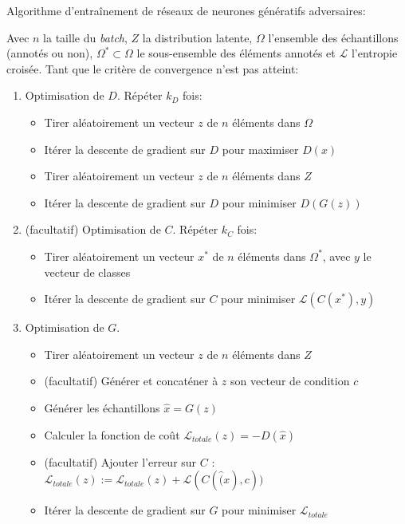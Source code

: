 \begin{definition}
	\label{def:gan}
	Algorithme d'entraînement de réseaux de neurones génératifs adversaires:

	Avec $n$ la taille du \emph{batch}, $Z$ la distribution latente, $\Omega$ l'ensemble des échantillons (annotés ou non), $\Omega^* \subset \Omega$ le sous-ensemble des éléments annotés et $\mathcal{L}$ l'entropie croisée.
	Tant que le critère de convergence n'est pas atteint:
	\begin{enumerate}
		\item Optimisation de $D$. Répéter $k_D$ fois:
		\begin{itemize}
			\item Tirer aléatoirement un vecteur $z$ de $n$ éléments dans $\Omega$
			\item Itérer la descente de gradient sur $D$ pour maximiser $D(x)$
			\item Tirer aléatoirement un vecteur $z$ de $n$ éléments dans $Z$
			\item Itérer la descente de gradient sur $D$ pour minimiser $D(G(z))$
		\end{itemize}
		\item (facultatif) Optimisation de $C$. Répéter $k_C$ fois:
		\begin{itemize}
			\item Tirer aléatoirement un vecteur $x^*$ de $n$ éléments dans $\Omega^*$, avec $y$ le vecteur de classes
			\item Itérer la descente de gradient sur $C$ pour minimiser $\mathcal{L}(C(x^*),y)$
		\end{itemize}
		\item Optimisation de $G$.
		\begin{itemize}
			\item Tirer aléatoirement un vecteur $z$ de $n$ éléments dans $Z$
			\item (facultatif) Générer et concaténer à $z$ son vecteur de condition $c$
			\item Générer les échantillons $\hat{x} = G(z)$
			\item Calculer la fonction de coût $\mathcal{L}_\mathit{totale}(z) = -D(\hat{x})$
			\item (facultatif) Ajouter l'erreur sur $C$ : $\mathcal{L}_\mathit{totale}(z) := \mathcal{L}_\mathit{totale}(z) + \mathcal{L}(C(\hat(x),c))$
			\item Itérer la descente de gradient sur $G$ pour minimiser $\mathcal{L}_\mathit{totale}$
		\end{itemize}
	\end{enumerate}
\end{definition}


